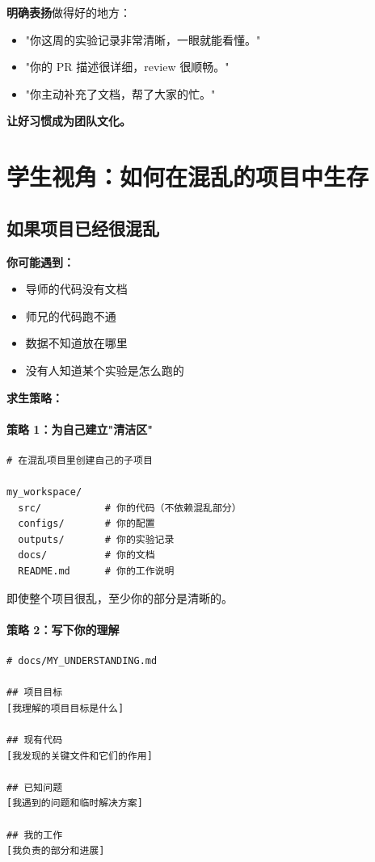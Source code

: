 \textbf{明确表扬}做得好的地方：
\begin{itemize}
  \item "你这周的实验记录非常清晰，一眼就能看懂。"
  \item "你的 PR 描述很详细，review 很顺畅。"
  \item "你主动补充了文档，帮了大家的忙。"
\end{itemize}

\textbf{让好习惯成为团队文化。}

\section{学生视角：如何在混乱的项目中生存}

\subsection{如果项目已经很混乱}

\textbf{你可能遇到：}
\begin{itemize}
  \item 导师的代码没有文档
  \item 师兄的代码跑不通
  \item 数据不知道放在哪里
  \item 没有人知道某个实验是怎么跑的
\end{itemize}

\textbf{求生策略：}

\paragraph{策略 1：为自己建立"清洁区"}

\begin{verbatim}
# 在混乱项目里创建自己的子项目

my_workspace/
  src/           # 你的代码（不依赖混乱部分）
  configs/       # 你的配置
  outputs/       # 你的实验记录
  docs/          # 你的文档
  README.md      # 你的工作说明
\end{verbatim}

即使整个项目很乱，至少你的部分是清晰的。

\paragraph{策略 2：写下你的理解}

\begin{verbatim}
# docs/MY_UNDERSTANDING.md

## 项目目标
[我理解的项目目标是什么]

## 现有代码
[我发现的关键文件和它们的作用]

## 已知问题
[我遇到的问题和临时解决方案]

## 我的工作
[我负责的部分和进展]
\end{verbatim}

